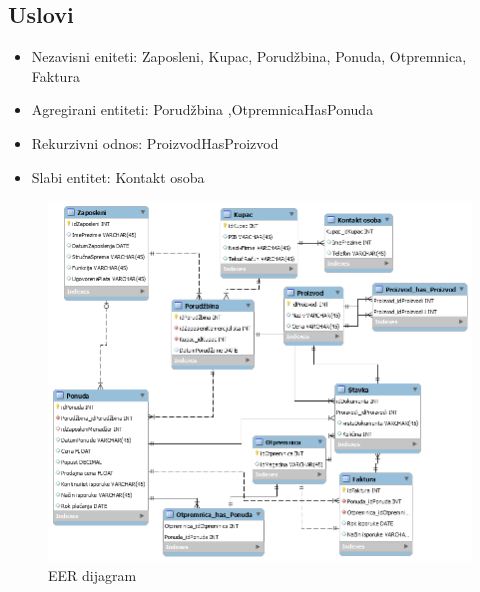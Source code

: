 \subsection{Uslovi}
\begin{itemize}
\item Nezavisni eniteti: Zaposleni, Kupac, Porudžbina, Ponuda, Otpremnica, Faktura
\item Agregirani entiteti: Porudžbina ,OtpremnicaHasPonuda
\item Rekurzivni odnos: ProizvodHasProizvod
\item Slabi entitet: Kontakt osoba
\end{itemize}

\clearpage

\begin{figure}[ht]
\centering
\includegraphics[width=160mm]{slike/eer.png}%
\caption{EER dijagram}
\end{figure}

\clearpage